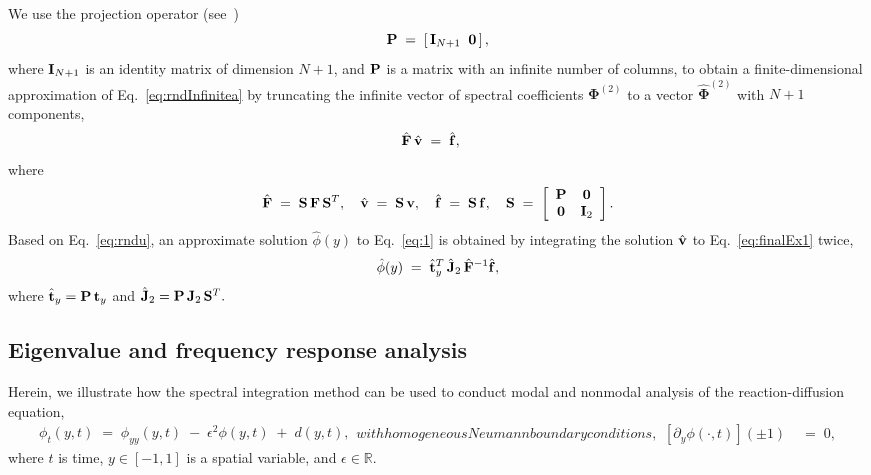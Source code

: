 \documentclass[%
secnumarabic,%
 amssymb, amsmath,%
 aps,prf,superscriptaddress,longbibliography
frontmatterverbose,
]{revtex4-2}
\begin{document}
We use the projection operator (see~\cite[Section 2.4]{OlvTowSIAM2013}) 
\begin{equation}\label{eq:project}
  \mathbf{P} \;=\; \left[\,\mathbf I_{N+1}\;\; \mathbf 0 \,\right],
\end{equation}
where $\mathbf I_{N+1}$ is an identity matrix of dimension $N+1$, and $\mathbf{P}$ is a matrix with an infinite number of columns, to obtain a finite-dimensional approximation of Eq.~\eqref{eq:rndInfinitea} by truncating the infinite vector of spectral coefficients $\boldsymbol \Phi^{(2)}$ to a vector $\hat{\boldsymbol \Phi}^{(2)}$ with $N + 1$ components,
\begin{align}\label{eq:finalEx1}
  \hat{\mathbf{F}}\,\hat{\mathbf{v}} \;&=\; \hat{\mathbf{f}},
\end{align}
where
	\begin{align}
	\label{eq:S}
	\hat{\mathbf{F}} \;=\;  \mathbf{S} \,\mathbf{F} \,\mathbf{S}^T, 
	\quad 
	\hat{\mathbf{v}} \;=\; \mathbf{S}\, \mathbf{v}, 
	\quad 
	\hat{\mathbf{f}} \;=\; \mathbf{S}\, \mathbf{f}, 
	\quad 
	\mathbf{S} 
	\;=\; 
	\left[
	\begin{array}{cc}
        \mathbf{P} & \mathbf 0 \\
        \mathbf 0 & \mathbf{I}_2
        \end{array}
        \right].
	\end{align}
Based on Eq.~\eqref{eq:rndu}, an approximate solution $\hat{\phi} (y)$ to Eq.~\eqref{eq:1} is obtained by integrating the solution $\hat{\mathbf{v}}$ to Eq.~\eqref{eq:finalEx1} twice,
	\begin{align}
	\label{eq:finalEx}
  	\hat{\phi} (y) 
	\; = \; 
	\hat{\mathbf{t}}_y^T 
	\, 
	\hat{\mathbf J}_2 
	\,
	\hat{\mathbf{F}}^{-1} 
	\hat{\mathbf{f}},
	\end{align}
where
	$
	\hat{\mathbf{t}}_y 
	= 
	\mathbf{P} \, \mathbf{t}_y
	$
and	
	$ 
	\hat {\mathbf{J}}_2 
	= 
	\mathbf{P} \, \mathbf J_2 \, \mathbf{S}^T.
	$

	\vspace*{-4ex}
	\subsection{Eigenvalue and frequency response analysis}
	\vspace*{-2ex}
Herein, we illustrate how the spectral integration method can be used to conduct modal and nonmodal analysis of the reaction-diffusion equation,
	\begin{subequations}
	\label{eq:rndTrans}
	\begin{align}
	\phi_{t}(y,t) 
	\; = \;  
	\phi_{yy}(y,t)  
	\; - \; 
	\epsilon^2 \phi (y,t) 
	\; + \; 
	d(y,t),
	\label{eq:0}
	\end{align}
with homogeneous Neumann boundary conditions,
\begin{align}
[\partial_y \phi (\cdot, t)](\pm 1) \;& =\; 0, \label{eq:0bc}
\end{align}
\end{subequations}
where $t$ is time, $y \in \left[ -1, 1 \right]$ is a spatial variable, and $ \epsilon \in \mathbb{R}$. 
\end{document}
